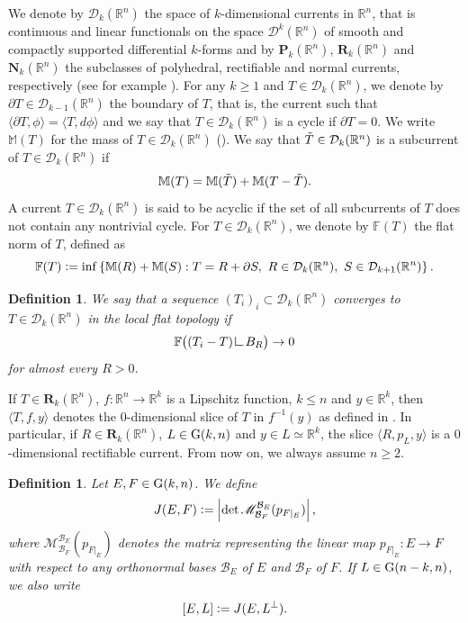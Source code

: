 \documentclass{article}
\numberwithin{equation}{section}
\theoremstyle{plain}%
\newtheorem{defin}[theorem]{Definition}
\theoremstyle{definition}
\theoremstyle{definition}
\newcommand{\rgrande}{\mathbb{R}}
\newcommand{\corrett}{\mathbf{R}_k(\rgrande^n)}
\newcommand{\corrnorm}{\mathbf{N}_k(\rgrande^n)}
\newcommand{\corrvar}[2]{\mathcal{D}_{#1}(\rgrande^{#2})}
\newcommand{\corrpol}{\mathbf{P}_k(\rgrande^n)}
\newcommand{\normaflat}{\mathbb{F}}
\newcommand{\corr}{\mathcal{D}_k(\rgrande^n)}
\newcommand{\massa}{\mathbb{M}}
\newcommand{\grass}{{\rm G}}
\newcommand{\grasskn}{\grass(k,n)}
\newcommand{\grassnmenokn}{\grass(n-k,n)}
\newcommand{\mrestr}{\mathop{\hbox{\vrule height 7pt width 0.5pt depth 0pt
\vrule height 0.5pt width 6pt depth 0pt}}\nolimits}
\newcommand{\slice}[3]{\langle{#1} , {#2}, {#3} \rangle}
\newcommand{\matrice}{\mathscr{M}}
\begin{document}
We denote by $\corr$ the space of $k$-dimensional currents in $\rgrande^n$, that is continuous and linear functionals on the space $\mathcal{D}^k(\rgrande^n)$ of smooth and compactly supported differential $k$-forms and by $\corrpol$, $\corrett$ and $\corrnorm$ the subclasses of polyhedral, rectifiable and normal currents, respectively (see for example \cite{federer}). For any $k \geq 1$ and $T \in \corr$, we denote by $\partial T \in \corrvar{k-1}{n}$ the boundary of $T$, that is, the current such that $\langle\partial T,\phi\rangle=\langle T,d\phi\rangle$ and we say that $T \in \corrvar{k}{n}$ is  a cycle if $\partial T =0$. We write $\massa(T)$ for the mass of $T \in \corr$ (\cite[Eq. 6.9]{MR756417}). We say that $\Tilde{T} \in \corrvar{k}{n}$ is a subcurrent of $T\in \corrvar{k}{n}$ if 
$$\massa(T) = \massa(\Tilde{T}) + \massa(T- \Tilde{T}).$$ A current $T \in \corrvar{k}{n}$ is said to be acyclic if the set of all subcurrents of $T$ does not contain any nontrivial cycle. For $T \in \corr$, we denote by $\normaflat(T)$ the flat norm of $T$, defined as
$$
\mathbb{F}(T) \vcentcolon=
\inf \left\{ \mathbb{M}(R) + \mathbb{M}(S) : T = R + \partial S,\ R \in \corr,\ S \in \corrvar{k+1}{n} \right\}.
$$
\begin{defin}\label{deflocalflat}
We say that a sequence $(T_i)_i \subset \corrvar{k}{n}$ converges to $T \in \corrvar{k}{n}$ in the \emph{local flat topology} if
$$
\mathbb F\bigl((T_i-T)\mrestr B_R\bigr)\to 0
$$
for almost every $R>0$.
\end{defin}

If $T \in \corrett$, $f: \rgrande^n \to \rgrande^k$ is a Lipschitz function, $k \leq n$ and $y \in \rgrande^k$, then $\slice{T}{f}{y}$ denotes the $0$-dimensional slice of $T$ in $f^{-1}(y)$ as defined in \cite[Sect. 4.3]{federer}. In particular, if $R \in \corrett$, $L \in \grasskn$ and $y \in L\simeq\rgrande^k$, the slice $\slice{R}{p_L}{y}$ is a $0$-dimensional rectifiable current. From now on, we always assume $n \geq 2$.

\begin{defin}\label{defjacobiano}
    Let $E, F \in \grasskn$. We define
    $$
    J(E,F) \vcentcolon= \left|\det \matrice^{\mathcal{B}_{E}}_{\mathcal{B}_{F}} (p_{{F} \vert_{E}})\right|,
    $$
    where $\matrice^{\mathcal B_E}_{\mathcal B_F}(p_{F|_E})$ denotes the matrix representing the linear map
    $p_{F|_E}:E\to F$ with respect to any orthonormal bases $\mathcal B_E$ of $E$ and $\mathcal B_F$ of $F$.
    If $L\in \grassnmenokn$, we also write
    $$[E,L]\vcentcolon=J(E,L^\perp).$$
\end{defin}
\end{document}
